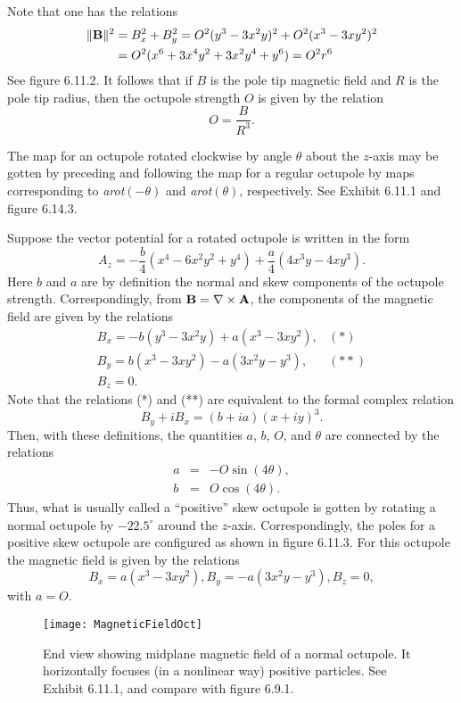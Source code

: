     Note that one has the relations
\begin{eqnarray*}
\|{\bf B}\|^2 &= B_x^2 + B_y^2 = O^2(y^3-3x^2 y)^2 + O^2(x^3 - 3x y^2)^2\\
              &= O^2(x^6+3x^4 y^2 + 3x^2 y^4 + y^6) = O^2 r^6
\end{eqnarray*}
See figure 6.11.2.  It follows that if $B$ is the pole tip magnetic field and $R$ is the pole tip radius, then the octupole strength $O$ is given by the relation
\[O=\frac{B}{R^3}.\]

    The map for an octupole rotated clockwise by angle $\theta$ about the
	$z$-axis may be gotten by preceding and following the map for a regular
	octupole by maps corresponding to {\em arot}$(-\theta)$ and {\em
	arot}$(\theta)$, respectively.  See Exhibit 6.11.1 and figure 6.14.3.

   Suppose the vector potential for a rotated octupole is written in the form
\[A_z = -\frac{b}{4}(x^4 - 6x^2 y^2 + y^4) + \frac{a}{4}(4x^3 y - 4x y^3). \]
Here $b$ and $a$ are by definition the normal and skew components of the
octupole strength.  Correspondingly, from ${\bf B} = \nabla \times {\bf A}$, the components of the magnetic field are given by the relations
\[\begin{array}{cl}
B_x=-b(y^3 - 3x^2 y) + a (x^3 - 3xy^2),&(*)\\
B_y=b(x^3-3xy^2) - a(3x^2 y - y^3),&(**)\\
B_z =0.
\end{array}\]
Note that the relations (*) and (**) are equivalent to the formal complex relation
\[B_y + iB_x = (b+ia)(x + iy)^3.\]
Then, with these definitions, the quantities $a$, $b$, $O$, and $\theta$ are connected by the relations
\begin{eqnarray*}
a&=&-O\sin(4\theta), \\
b&=&O\cos(4\theta).
\end{eqnarray*}
Thus, what is usually called a ``positive'' skew octupole is gotten by
rotating a normal octupole by ${-22.5}^\circ$ around the $z$-axis.
Correspondingly, the poles for a positive skew octupole are configured as
shown in figure 6.11.3.  For this octupole the magnetic field is given by the relations
\[B_x = a(x^3 - 3xy^2) , B_y = -a(3x^2 y - y^3) , B_z = 0, \]
with $a=O$.




\begin{figure}[p]
  \centering
  \texttt{[image: MagneticFieldOct]}
  \caption{End view showing midplane magnetic field of a normal octupole.
It horizontally focuses (in a nonlinear way) positive particles.  See
Exhibit 6.11.1, and compare with figure 6.9.1.}
\end{figure}


